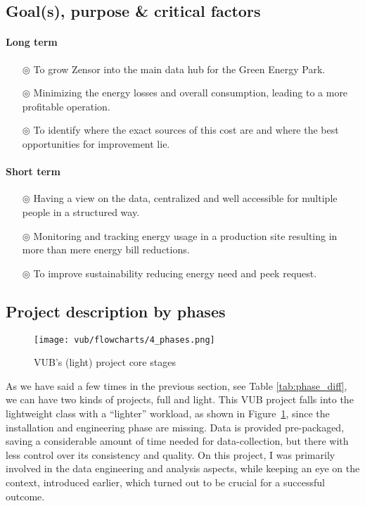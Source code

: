 \subsection{Goal(s), purpose \& critical factors}


\paragraph{Long term}
\begin{itemize}
    \item[$\circledcirc$] To grow Zensor into the main data hub for the Green Energy Park.
    \item[$\circledcirc$] Minimizing the energy losses and overall consumption, leading to a more profitable operation.
    \item[$\circledcirc$] To identify where the exact sources of this cost are and where the best opportunities for improvement lie.
\end{itemize}
\clearpage
\paragraph{Short term}
\begin{itemize}
    \item[$\circledcirc$] Having a view on the data, centralized and well accessible for multiple people in a structured way.
    \item[$\circledcirc$] Monitoring and tracking energy usage in a production site resulting in more than mere energy bill reductions.
    \item[$\circledcirc$] To improve sustainability reducing energy need and peek request. 
\end{itemize}

\subsection{Project description by phases}
\begin{figure}[ht]
    \texttt{[image: vub/flowcharts/4\_phases.png]}
    \caption{\ac{VUB}'s (light) project core stages}
    \label{fig:vub_stages}
\end{figure}
As we have said a few times in the previous section, see Table \ref{tab:phase_diff}, we can have two kinds of projects, full and light. 
This \ac{VUB} project falls into the lightweight class with a ``lighter'' workload, as shown in Figure~\ref{fig:vub_stages}, since the installation and engineering phase are missing. 
Data is provided pre-packaged, saving a considerable amount of time needed for data-collection,  but there with less control over its consistency and quality.
On this project, I was primarily involved in the data engineering and analysis aspects, while keeping an eye on the context, introduced earlier, which turned out to be crucial for a successful outcome.

